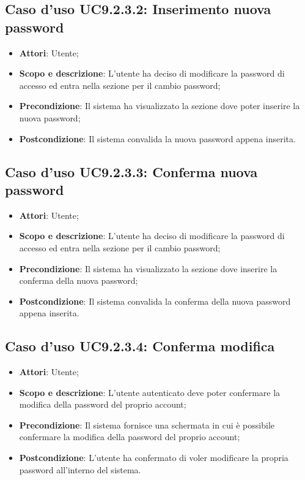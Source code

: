 \documentclass[12pt,a4paper]{article}
\begin{document}
\subsection{Caso d'uso UC9.2.3.2:  Inserimento nuova password}\begin{itemize}
	\item \textbf{Attori}: Utente;
	\item \textbf{Scopo e descrizione}: L’utente ha deciso di modificare la password di accesso ed entra nella sezione per il cambio password; 
	\item \textbf{Precondizione}: Il sistema ha visualizzato la sezione dove poter inserire la nuova password;
	\item \textbf{Postcondizione}: Il sistema convalida la nuova password appena inserita.
\end{itemize}
\hypertarget{UC9.2.3.3}{}
\subsection{Caso d'uso UC9.2.3.3: Conferma nuova password}\begin{itemize}
	\item \textbf{Attori}: Utente;
	\item \textbf{Scopo e descrizione}: L’utente ha deciso di modificare la password di accesso ed entra nella sezione per il cambio password; 
	\item \textbf{Precondizione}: Il sistema ha visualizzato la sezione dove inserire la conferma della nuova password;
	\item \textbf{Postcondizione}: Il sistema convalida la conferma della nuova password appena inserita.
\end{itemize}
\hypertarget{UC9.2.3.4}{}
\subsection{Caso d'uso UC9.2.3.4: Conferma modifica}\begin{itemize}
	\item \textbf{Attori}: Utente;
	\item \textbf{Scopo e descrizione}: L’utente autenticato deve poter confermare la modifica della password del proprio account; 
	\item \textbf{Precondizione}: Il sistema fornisce una schermata in cui è possibile confermare la modifica della password del proprio account;
	\item \textbf{Postcondizione}: L’utente ha confermato di voler modificare la propria password all’interno del sistema.
\end{itemize}
\hypertarget{UC9.2.4}{}
\end{document}
